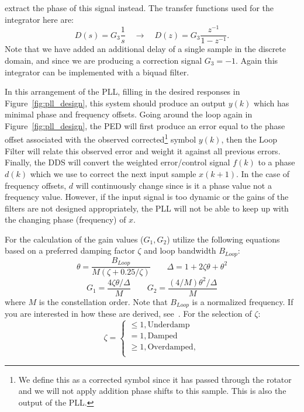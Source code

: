\documentclass[letterpaper,12pt]{article}
\begin{document}
extract the phase of this signal instead.  The transfer functions used for the integrator here are:
%
\begin{equation}
 D(s) = G_3\frac{1}{s} \quad\rightarrow\quad D(z) = G_3\frac{z^{-1}}{1-z^{-1}}.
\end{equation}
%
Note that we have added an additional delay of a single sample in the discrete domain, and since we are 
producing a correction signal $G_3=-1$. Again this integrator can be implemented with a biquad filter.\par
%
In this arrangement of the PLL, filling in the desired responses in Figure~\ref{fig:pll_design}, this system 
should produce an output $y(k)$ which has minimal phase and frequency offsets.  Going around the loop again 
in Figure~\ref{fig:pll_design}, the PED will first produce an error equal to the phase offset associated with 
the observed corrected\footnote{We define this as a corrected symbol since it has passed through the rotator 
and we will not apply addition phase shifts to this sample.  This is also the output of the PLL.} symbol 
$y(k)$, then the Loop Filter will relate this observed error and weight it against all previous errors.  
Finally, the DDS will convert the weighted error/control signal $f(k)$ to a phase $d(k)$ which we use to 
correct the next input sample $x(k+1)$.  In the case of frequency offsets, $d$ will continuously change since 
is it a phase value not a frequency value. However, if the input signal is too dynamic or the gains of the 
filters are not designed appropriately, the PLL will not be able to keep up with the changing phase 
(frequency) of $x$.\par
%
For the calculation of the gain values ($G_1,G_2$) utilize the following equations based on a preferred 
damping factor $\zeta$ and loop bandwidth $B_{Loop}$:
%
\begin{equation}
  \theta = \frac{B_{Loop}}{M(\zeta + 0.25/\zeta)} \quad \quad \Delta = 1 + 2\zeta\theta + \theta^2
\end{equation}
\begin{equation}
  G_1 = \frac{4\zeta\theta/\Delta}{M} \quad \quad G_2 = \frac{(4/M)\theta^2/\Delta}{M}
\end{equation}
%
where $M$ is the constellation order.  Note that $B_{Loop}$ is a normalized frequency.  If you are interested 
in how these are derived, see~\cite[Appendix~C]{rice2009}.  For the selection of $\zeta$:
%
\begin{equation}
 \zeta = \begin{cases}
         \le 1, \text{Underdamp}\\
         =1, \text{Damped}\\
         \ge 1, \text{Overdamped},\\
         \end{cases}
\end{equation}
\end{document}
